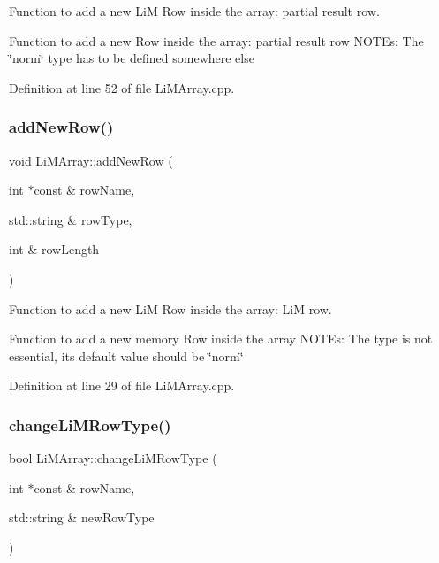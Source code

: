 Function to add a new LiM Row inside the array\+: partial result row. 

Function to add a new Row inside the array\+: partial result row N\+O\+T\+Es\+: The \char`\"{}norm\char`\"{} type has to be defined somewhere else 

Definition at line 52 of file Li\+M\+Array.\+cpp.

\mbox{\label{classoctantis_1_1LiMArray_a6c300ff9df7342e8593e2db9f265cbd2}} 
\subsubsection{\texorpdfstring{add\+New\+Row()}{addNewRow()}}
{\footnotesize\ttfamily void Li\+M\+Array\+::add\+New\+Row (\begin{DoxyParamCaption}\item[{int $\ast$const \&}]{row\+Name,  }\item[{std\+::string \&}]{row\+Type,  }\item[{int \&}]{row\+Length }\end{DoxyParamCaption})}



Function to add a new LiM Row inside the array\+: LiM row. 

Function to add a new memory Row inside the array N\+O\+T\+Es\+: The type is not essential, its default value should be \char`\"{}norm\char`\"{} 

Definition at line 29 of file Li\+M\+Array.\+cpp.

\mbox{\label{classoctantis_1_1LiMArray_acc1bcd7ac09e11848c885a116ae18d8c}} 
\subsubsection{\texorpdfstring{change\+Li\+M\+Row\+Type()}{changeLiMRowType()}}
{\footnotesize\ttfamily bool Li\+M\+Array\+::change\+Li\+M\+Row\+Type (\begin{DoxyParamCaption}\item[{int $\ast$const \&}]{row\+Name,  }\item[{std\+::string \&}]{new\+Row\+Type }\end{DoxyParamCaption})}



